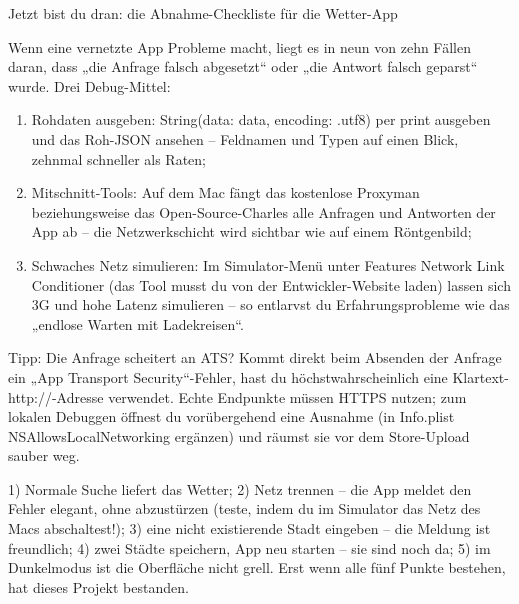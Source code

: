 \begin{tcbpractice}{Jetzt bist du dran: die Abnahme-Checkliste für die Wetter-App}

Wenn eine vernetzte App Probleme macht, liegt es in neun von zehn Fällen daran, dass „die Anfrage falsch abgesetzt“ oder „die Antwort falsch geparst“ wurde. Drei Debug-Mittel:

\begin{enumerate}
  \item Rohdaten ausgeben: String(data: data, encoding: .utf8) per print ausgeben und das Roh-JSON ansehen – Feldnamen und Typen auf einen Blick, zehnmal schneller als Raten;
  \item Mitschnitt-Tools: Auf dem Mac fängt das kostenlose Proxyman beziehungsweise das Open-Source-Charles alle Anfragen und Antworten der App ab – die Netzwerkschicht wird sichtbar wie auf einem Röntgenbild;
  \item Schwaches Netz simulieren: Im Simulator-Menü unter Features Network Link Conditioner (das Tool musst du von der Entwickler-Website laden) lassen sich 3G und hohe Latenz simulieren – so entlarvst du Erfahrungsprobleme wie das „endlose Warten mit Ladekreisen“.
\end{enumerate}

\begin{tcbinfo}{Tipp: Die Anfrage scheitert an ATS?}
Kommt direkt beim Absenden der Anfrage ein „App Transport Security“-Fehler, hast du höchstwahrscheinlich eine Klartext-http://-Adresse verwendet. Echte Endpunkte müssen HTTPS nutzen; zum lokalen Debuggen öffnest du vorübergehend eine Ausnahme (in Info.plist NSAllowsLocalNetworking ergänzen) und räumst sie vor dem Store-Upload sauber weg.

\end{tcbinfo}

1) Normale Suche liefert das Wetter; 2) Netz trennen – die App meldet den Fehler elegant, ohne abzustürzen (teste, indem du im Simulator das Netz des Macs abschaltest!); 3) eine nicht existierende Stadt eingeben – die Meldung ist freundlich; 4) zwei Städte speichern, App neu starten – sie sind noch da; 5) im Dunkelmodus ist die Oberfläche nicht grell. Erst wenn alle fünf Punkte bestehen, hat dieses Projekt bestanden.

\end{tcbpractice}

